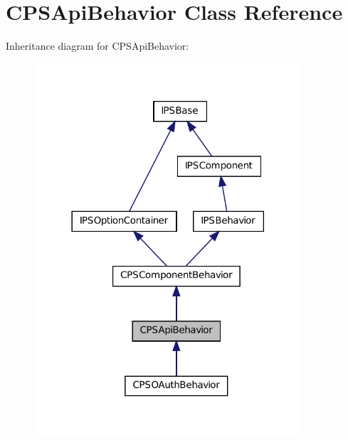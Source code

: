 \hypertarget{classCPSApiBehavior}{
\section{CPSApiBehavior Class Reference}
\label{classCPSApiBehavior}
}


Inheritance diagram for CPSApiBehavior:\nopagebreak
\begin{figure}[H]
\begin{center}
\leavevmode
\includegraphics[width=282pt]{classCPSApiBehavior__inherit__graph}
\end{center}
\end{figure}


